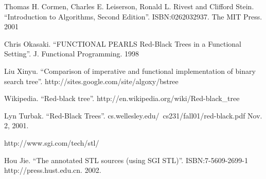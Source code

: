 \documentclass{article}
\begin{document}
\begin{thebibliography}{99}

Thomas H. Cormen, Charles E. Leiserson, Ronald L. Rivest and Clifford Stein. 
``Introduction to Algorithms, Second Edition''. ISBN:0262032937. The MIT Press. 2001

Chris Okasaki. ``FUNCTIONAL PEARLS Red-Black Trees in a Functional Setting''. J. Functional Programming. 1998

Liu Xinyu. ``Comparison of imperative and functional implementation of binary search tree''. http://sites.google.com/site/algoxy/bstree

Wikipedia. ``Red-black tree''. http://en.wikipedia.org/wiki/Red-black\_tree

Lyn Turbak. ``Red-Black Trees''. cs.wellesley.edu/~cs231/fall01/red-black.pdf Nov. 2, 2001.

http://www.sgi.com/tech/stl/

Hou Jie. ``The annotated STL sources (using SGI STL)''. ISBN:7-5609-2699-1 http://press.hust.edu.cn. 2002.

\end{thebibliography}

\ifx\wholebook\relax\else
\end{document}
